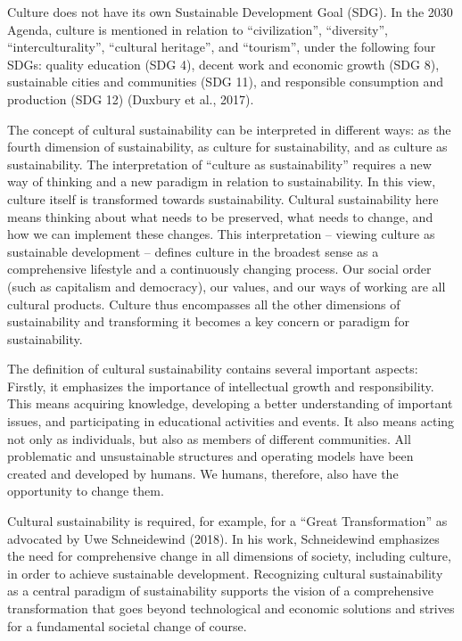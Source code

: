 \documentclass[
  a4paper,
  openany]{book}
\begin{document}
Culture does not have its own Sustainable Development Goal (SDG). In the
2030 Agenda, culture is mentioned in relation to ``civilization'',
``diversity'', ``interculturality'', ``cultural heritage'', and
``tourism'', under the following four SDGs: quality education (SDG 4),
decent work and economic growth (SDG 8), sustainable cities and
communities (SDG 11), and responsible consumption and production (SDG
12) (Duxbury et al., 2017).

The concept of cultural sustainability can be interpreted in different
ways: as the fourth dimension of sustainability, as culture for
sustainability, and as culture as sustainability. The interpretation of
``culture as sustainability'' requires a new way of thinking and a new
paradigm in relation to sustainability. In this view, culture itself is
transformed towards sustainability. Cultural sustainability here means
thinking about what needs to be preserved, what needs to change, and how
we can implement these changes. This interpretation -- viewing culture
as sustainable development -- defines culture in the broadest sense as a
comprehensive lifestyle and a continuously changing process. Our social
order (such as capitalism and democracy), our values, and our ways of
working are all cultural products. Culture thus encompasses all the
other dimensions of sustainability and transforming it becomes a key
concern or paradigm for sustainability.

The definition of cultural sustainability contains several important
aspects: Firstly, it emphasizes the importance of intellectual growth
and responsibility. This means acquiring knowledge, developing a better
understanding of important issues, and participating in educational
activities and events. It also means acting not only as individuals, but
also as members of different communities. All problematic and
unsustainable structures and operating models have been created and
developed by humans. We humans, therefore, also have the opportunity to
change them.

Cultural sustainability is required, for example, for a ``Great
Transformation'' as advocated by Uwe Schneidewind (2018). In his work,
Schneidewind emphasizes the need for comprehensive change in all
dimensions of society, including culture, in order to achieve
sustainable development. Recognizing cultural sustainability as a
central paradigm of sustainability supports the vision of a
comprehensive transformation that goes beyond technological and economic
solutions and strives for a fundamental societal change of course.
\end{document}
